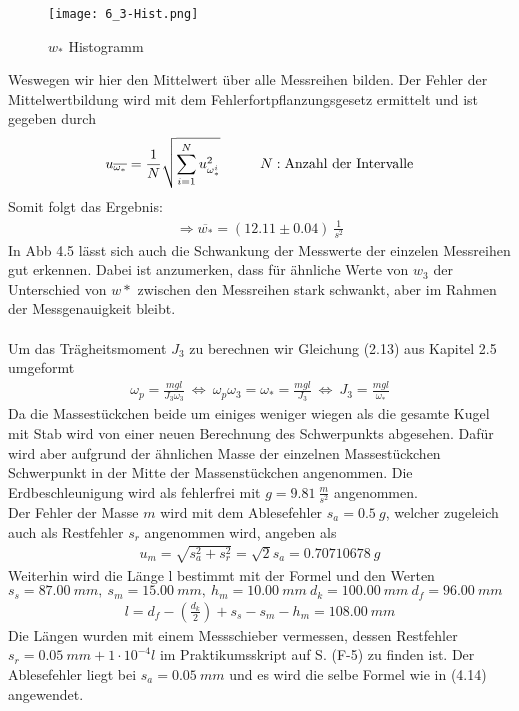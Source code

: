 \begin{figure}[ht]
    \centering
    \caption{$w_*$ Histogramm}
    \texttt{[image: 6\_3-Hist.png]}
\end{figure}
Weswegen wir hier den Mittelwert über alle Messreihen bilden. Der Fehler der Mittelwertbildung wird mit dem Fehlerfortpflanzungsgesetz ermittelt und ist gegeben durch
\begin{align}
    u_{\overline{\omega_*}}=\frac{1}{N}\sqrt{\sum_{i=1}^{N} u_{\omega_*^i}^2}\tab N:\text{Anzahl der Intervalle}
\end{align}
Somit folgt das Ergebnis:
\begin{align*}
    \Rightarrow\boxed{\overline{w_*}=(12.11 \pm 0.04)~\frac{1}{s^2}}
\end{align*}
In Abb 4.5 lässt sich auch die Schwankung der Messwerte der einzelen Messreihen gut erkennen. Dabei ist anzumerken, dass für ähnliche Werte von $w_3$ der Unterschied von $w*$ zwischen den Messreihen stark schwankt, aber im Rahmen der Messgenauigkeit bleibt.\\ \\
Um das Trägheitsmoment $J_3$ zu berechnen wir Gleichung (2.13) aus Kapitel 2.5 umgeformt
\begin{align}
    \omega_p = \frac{mgl}{J_3\omega_3}~\Leftrightarrow~\omega_p\omega_3 = \omega_* = \frac{mgl}{J_3}~\Leftrightarrow~J_3 = \frac{mgl}{\omega_*}
\end{align}
Da die Massestückchen beide um einiges weniger wiegen als die gesamte Kugel mit Stab wird von einer neuen Berechnung des Schwerpunkts abgesehen. Dafür wird aber aufgrund der ähnlichen Masse der einzelnen Massestückchen Schwerpunkt in der Mitte der Massenstückchen angenommen. Die Erdbeschleunigung wird als fehlerfrei mit $g=9.81~\frac{m}{s^2}$ angenommen. \\
Der Fehler der Masse $m$ wird mit dem Ablesefehler $s_a=0.5~g$, welcher zugeleich auch als Restfehler $s_r$ angenommen wird, angeben als
\begin{align}
    u_m=\sqrt{s_a^2+s_r^2}=\sqrt{2}s_a=0.70710678~g
\end{align}
Weiterhin wird die Länge l bestimmt mit der Formel und den Werten $s_s=87.00~mm,~s_m=15.00~mm,~h_m=10.00~mm~d_k=100.00~mm~d_f=96.00~mm$
\begin{align}
    l = d_f - \left(\frac{d_k}{2}\right) + s_s - s_m - h_m=108.00~mm 
\end{align}
Die Längen wurden mit einem Messschieber vermessen, dessen Restfehler \\ $s_r=0.05~mm+1\cdot10^{-4}l$ im Praktikumsskript auf S. (F-5) zu finden ist. Der Ablesefehler liegt bei $s_a=0.05~mm$ und es wird die selbe Formel wie in (4.14) angewendet.
